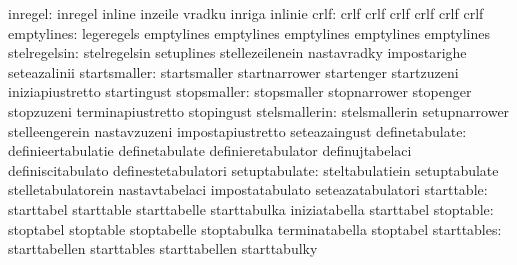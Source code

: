                          inregel: inregel                          inline
                                  inzeile                          vradku
                                  inriga                           inlinie
                            crlf: crlf                             crlf
                                  crlf                             crlf
                                  crlf                             crlf
emptylines: legeregels emptylines
            emptylines emptylines
            emptylines emptylines
                    stelregelsin: stelregelsin                     setuplines
                                  stellezeilenein                  nastavradky
                                  impostarighe                     seteazalinii
                    startsmaller: startsmaller                     startnarrower
                                  startenger                       startzuzeni
                                  iniziapiustretto                 startingust
                     stopsmaller: stopsmaller                      stopnarrower
                                  stopenger                        stopzuzeni
                                  terminapiustretto                stopingust
                   stelsmallerin: stelsmallerin                    setupnarrower
                                  stelleengerein                   nastavzuzeni
                                  impostapiustretto                seteazaingust
                  definetabulate: definieertabulatie               definetabulate
                                  definieretabulator               definujtabelaci
                                  definiscitabulato                definestetabulatori
                   setuptabulate: steltabulatiein                  setuptabulate
                                  stelletabulatorein               nastavtabelaci
                                  impostatabulato                  seteazatabulatori
                      starttable: starttabel                       starttable
                                  starttabelle                     starttabulka
                                  iniziatabella                    starttabel
                       stoptable: stoptabel                        stoptable
                                  stoptabelle                      stoptabulka
                                  terminatabella                   stoptabel
                     starttables: starttabellen                    starttables
                                  starttabellen                    starttabulky
